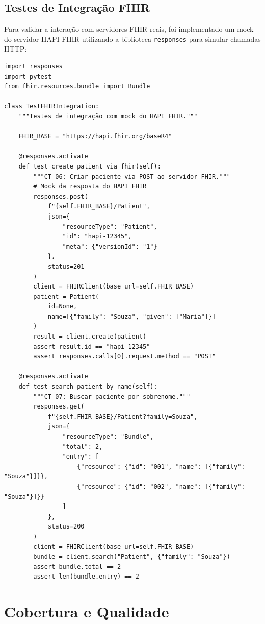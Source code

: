 \subsection{Testes de Integração FHIR}

Para validar a interação com servidores FHIR reais, foi implementado um mock do servidor HAPI FHIR utilizando a biblioteca \texttt{responses} para simular chamadas HTTP:

\begin{lstlisting}[style=pythonstyle, caption=Mock de servidor FHIR para testes de integração, label=code:fhir_mock]
import responses
import pytest
from fhir.resources.bundle import Bundle

class TestFHIRIntegration:
    """Testes de integração com mock do HAPI FHIR."""
    
    FHIR_BASE = "https://hapi.fhir.org/baseR4"
    
    @responses.activate
    def test_create_patient_via_fhir(self):
        """CT-06: Criar paciente via POST ao servidor FHIR."""
        # Mock da resposta do HAPI FHIR
        responses.post(
            f"{self.FHIR_BASE}/Patient",
            json={
                "resourceType": "Patient",
                "id": "hapi-12345",
                "meta": {"versionId": "1"}
            },
            status=201
        )
        client = FHIRClient(base_url=self.FHIR_BASE)
        patient = Patient(
            id=None,
            name=[{"family": "Souza", "given": ["Maria"]}]
        )
        result = client.create(patient)
        assert result.id == "hapi-12345"
        assert responses.calls[0].request.method == "POST"
    
    @responses.activate
    def test_search_patient_by_name(self):
        """CT-07: Buscar paciente por sobrenome."""
        responses.get(
            f"{self.FHIR_BASE}/Patient?family=Souza",
            json={
                "resourceType": "Bundle",
                "total": 2,
                "entry": [
                    {"resource": {"id": "001", "name": [{"family": "Souza"}]}},
                    {"resource": {"id": "002", "name": [{"family": "Souza"}]}}
                ]
            },
            status=200
        )
        client = FHIRClient(base_url=self.FHIR_BASE)
        bundle = client.search("Patient", {"family": "Souza"})
        assert bundle.total == 2
        assert len(bundle.entry) == 2
\end{lstlisting}

\section{Cobertura e Qualidade}

